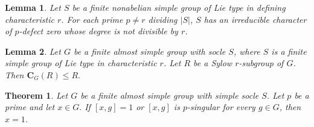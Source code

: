\documentclass[10pt,a4paper]{amsart}
\newtheorem{lem}{Lemma}
\newtheorem{thm}{Theorem}
\newcommand{\CB}{\mathbf{C}}
\renewcommand{\leq}{\leqs}
\newcommand{\leqs}{\leqslant}
\begin{document}
\begin{lem}\label{lem:semisimple}
Let $S$ be a finite nonabelian simple group of Lie type in defining characteristic $r$. For each prime $p\neq r$ dividing $|S|$, $S$ has an irreducible character of $p$-defect zero whose degree is not divisible by $r$.
\end{lem}

 \begin{lem}\label{lem:Sylow-centralizers}
 Let $G$ be a finite almost simple group with socle $S$, where $S$ is  a finite simple group of Lie type in characteristic $r$.  Let $R$ be a Sylow $r$-subgroup of $G$. Then $\CB_G(R)\leq R.$ 
 \end{lem}

\begin{thm}\label{th:almost-simple}
Let $G$ be a finite almost simple group with simple socle $S$. Let $p$ be a prime and let $x\in G.$ If $[x,g]=1$ or $[x,g]$ is $p$-singular for every $g\in G$, then $x=1$.
\end{thm}
\end{document}
